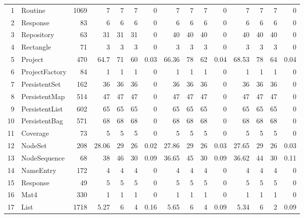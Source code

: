 \documentclass{acm_proc_article-sp}
\begin{document}
\begin{table} [htp!]
{\begin{tabularx}{1.2 \textwidth}{r l r r r r r r r r r r r r r}
 1						& Routine						&1069	& 7	&	7	&	7	& 		0					& 7		&  7		& 7		& 		0			& 7			& 7			& 7			&	0	\\
 2						& Response					&83	& 6	&	6	&	6	& 		0					& 6		&  6		& 6		& 		0			& 6			& 6			& 6			&	0	\\
 3						& Repository					&63	& 31	&	31	&	31	& 		0					& 40		&  40		& 40		& 		0			& 40			& 40			& 40			&	0	\\      
 4						& Rectangle					&71	& 3	&	3	&	3	& 		0					& 3		&  3 		& 3		& 		0			& 3			& 3			& 3			&	0	\\      
 5						& Project						&470	& 64.7&	71	&	60	& 		0.03					& 66.36	&  78		& 62		& 		0.04			& 68.53		& 78			& 64			&	0.04	\\      
 6						& ProjectFactory				&84	& 1	&	1	&	1	& 		0					& 1		&  1		& 1		& 		0			& 1			& 1			& 1			&	0	\\      
 7						& PersistentSet					&162	& 36	&	36	&	36	& 		0					& 36		&  36		& 36		& 		0			& 36			& 36			& 36 			&	0	\\      
 8						& PersistentMap				&514	& 47	&	47	&	47	& 		0					& 47		&  47		& 47		& 		0			& 47			& 47			& 47			&	0	\\      
 9						& PersistentList					&602	& 65	&	65	&	65	& 		0					& 65		&  65		& 65		& 		0			& 65			& 65			& 65			&	0	\\      
 10						& PersistentBag				&571	& 68	&	68	&	68	& 		0					& 68		&  68		& 68		& 		0			& 68			& 68			& 68			&	0	\\      
 11						& Coverage					&73	& 5	&	5	&	5	& 		0					& 5		& 5		& 5		& 		0			& 5			& 5			& 5			&	0	\\      
 12						& NodeSet					&208	& 28.06&	29	&	26	& 		0.02					& 27.86	& 29 		& 26		& 		0.03			& 27.65		& 29			& 26			&	0.03	\\      
 13						& NodeSequence				&68	& 38	&	46	&	30	& 		0.09					& 36.65	& 45 		& 30		& 		0.09			& 36.62		& 44			& 30			&	0.11	\\      
 14						& NameEntry					&172	& 4	&	4	&	4	& 		0					& 4		& 4 		& 4		& 		0			& 4			& 4			& 4			&	0	\\      
 15						& Response					&49	& 5	&	5	&	5	& 		0					& 5		& 5 		& 5		& 		0			& 5			& 5			& 5			&	0	\\      
 16						& Mat4						&330	& 1	&	1	&	1	& 		0					& 1		&  1		& 1		& 		0			& 1			& 1			& 1			&	0	\\      
 17						& List						&1718	& 5.27&	6	&	4	& 		0.16					& 5.65	& 6 		& 4		& 		0.09			& 5.34		& 6			& 2			&	0.09\\      

\end{tabularx}}
\end{table}
\end{document}
